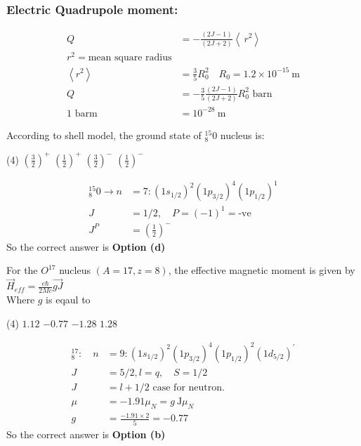 \subsubsection{Electric Quadrupole moment:}
\begin{align*}
Q&=-\frac{(2 J-1)}{(2 J+2)}\left\langle\ r^{2}\right\rangle \\r^{2} =\text{mean square radius}\\
\left\langle r^{2}\right\rangle&=\frac{3}{5} R_{0}^{2}\quad R_{0}=1.2 \times 10^{-15} \mathrm{~m}\\
Q&=-\frac{3}{5} \frac{(2 J-1)}{(2 J+2)} R_{0}^{2}\text{ barn}\\
1 \text { barm }&=10^{-28} \mathrm{~m}
\end{align*}
\begin{exercise}
	According to shell model, the ground state of ${ }_{8}^{15} 0$ nucleus is:
	 \begin{tasks}(4)
		\task[\textbf{a.}]$\left(\frac{3}{2}\right)^{+}$
		\task[\textbf{b.}] $\left(\frac{1}{2}\right)^{+}$
		\task[\textbf{c.}] $\left(\frac{3}{2}\right)^{-}$
		\task[\textbf{d.}] $\left(\frac{1}{2}\right)^{-}$
	\end{tasks}
\end{exercise}
\begin{answer}
	\begin{align*}
	{ }_{8}^{15} 0 \rightarrow n&=7:\left(1 s_{1 / 2}\right)^{2}\left(1 p_{3 / 2}\right)^{4}\left(1 p_{1 / 2}\right)^{1}\\
	J&=1 / 2, \quad P=(-1)^{1}=\text {-ve }\\
	J^{P}&=\left(\frac{1}{2}\right)^{-}
	\end{align*}
	So the correct answer is \textbf{Option (d)}
\end{answer}
\begin{exercise}
	For the $O^{17}$ nucleus $(A=17, z=8)$, the effective magnetic moment is given by \\
	$\vec{H}_{e f f}=\frac{e \hbar}{2 M c} \overrightarrow{g J}$\\
	 Where $g$ is eqaul to 
	 \begin{tasks}(4)
	 	\task[\textbf{a.}]$1.12$
	 	\task[\textbf{b.}] $-0.77$
	 	\task[\textbf{c.}]$-1.28$
	 	\task[\textbf{d.}] $1.28$ 
	 \end{tasks}
\end{exercise}
\begin{answer}
	\begin{align*}
	{ }_{8}^{17}: \quad n&=9:\left(1 s_{1 / 2}\right)^{2}\left(1 p_{3 / 2}\right)^{4}\left(1 p_{1 / 2}\right)^{2}\left(1 d _{5/2}\right)^{\prime}\\
	J&=5 / 2, l=q, \quad S=1 / 2\\
	J&=l+1 / 2 \text { case for neutron. }\\
	\mu&=-1.91 \mu_{N}=g \mathrm{~J} \mu_{N}\\
	g&=\frac{-1.91 \times 2}{5}=-0.77
	\end{align*}
	So the correct answer is \textbf{Option (b)}
\end{answer}

